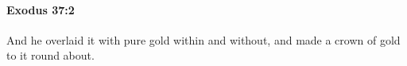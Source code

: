 
		\paragraph{Exodus 37:2} %
			\label{EXODUS-37-2}

			And he overlaid it with pure gold within and without, and made a crown of gold to it round about.


